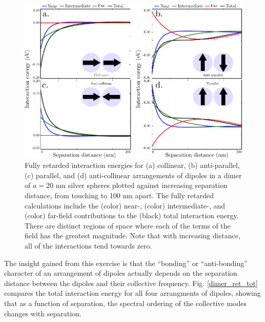\documentclass [11pt, proquest] {uwthesis}[2016/11/22]
\begin{document}
\begin{figure}
\begin{centering}
\includegraphics{dimer_ret.pdf}
\caption{Fully retarded interaction energies for (a) collinear, (b) anti-parallel, (c) parallel, and (d) anti-collinear arrangements of dipoles in a dimer of $a=20$ nm silver spheres plotted against increasing separation distance, from touching to 100 nm apart. The fully retarded calculations include the (color) near-, (color) intermediate-, and (color) far-field contributions to the (black) total interaction energy. There are distinct regions of space where each of the terms of the field has the greatest magnitude. Note that with increasing distance, all of the interactions tend towards zero.}
\label{dimer_ret}
\end{centering}
\end{figure}

The insight gained from this exercise is that the ``bonding'' or ``anti-bonding'' character of an arrangement of dipoles actually depends on the separation distance between the dipoles and their collective frequency. Fig. \ref{dimer_ret_tot} compares the total interaction energy for all four arrangments of dipoles, showing that as a function of separation, the spectral ordering of the collective modes changes with separation.
\end{document}
